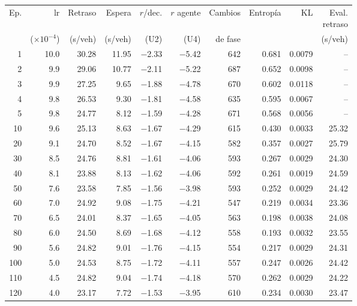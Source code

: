 \begin{table}[H]
\centering
\scriptsize
\setlength{\tabcolsep}{3pt}
\setlength{\tabcolsep}{2pt}
\begin{tabular}{rrrrrrrrrr}
\toprule
Ep. & lr & Retraso & Espera & $r$/dec. & $r$ agente & Cambios & Entropía & KL & \makecell{Eval.\\retraso} \\
 & ($\times 10^{-4}$) & (s/veh) & (s/veh) & (U2) & (U4) & de fase &  &  & (s/veh) \\
\midrule
1 & 10.0 & 30.28 & 11.95 & $-$2.33 & $-$5.42 & 642 & 0.681 & 0.0079 & -- \\
2 & 9.9 & 29.06 & 10.77 & $-$2.11 & $-$5.22 & 687 & 0.652 & 0.0098 & -- \\
3 & 9.9 & 27.25 & 9.65 & $-$1.88 & $-$4.78 & 670 & 0.602 & 0.0118 & -- \\
4 & 9.8 & 26.53 & 9.30 & $-$1.81 & $-$4.58 & 635 & 0.595 & 0.0067 & -- \\
5 & 9.8 & 24.77 & 8.12 & $-$1.59 & $-$4.28 & 671 & 0.568 & 0.0056 & -- \\
10 & 9.6 & 25.13 & 8.63 & $-$1.67 & $-$4.29 & 615 & 0.430 & 0.0033 & 25.32 \\
20 & 9.1 & 24.70 & 8.52 & $-$1.67 & $-$4.15 & 582 & 0.357 & 0.0027 & 25.79 \\
30 & 8.5 & 24.76 & 8.81 & $-$1.61 & $-$4.06 & 593 & 0.267 & 0.0029 & 24.30 \\
40 & 8.1 & 23.88 & 8.13 & $-$1.62 & $-$4.06 & 592 & 0.261 & 0.0019 & 24.59 \\
50 & 7.6 & 23.58 & 7.85 & $-$1.56 & $-$3.98 & 593 & 0.252 & 0.0029 & 24.42 \\
60 & 7.0 & 24.92 & 9.08 & $-$1.75 & $-$4.21 & 547 & 0.219 & 0.0034 & 23.36 \\
70 & 6.5 & 24.01 & 8.37 & $-$1.65 & $-$4.05 & 563 & 0.198 & 0.0038 & 24.08 \\
80 & 6.0 & 24.50 & 8.69 & $-$1.68 & $-$4.12 & 558 & 0.193 & 0.0032 & 23.55 \\
90 & 5.6 & 24.82 & 9.01 & $-$1.76 & $-$4.15 & 554 & 0.217 & 0.0029 & 24.31 \\
100 & 5.0 & 24.53 & 8.75 & $-$1.72 & $-$4.11 & 557 & 0.247 & 0.0026 & 24.42 \\
110 & 4.5 & 24.82 & 9.04 & $-$1.74 & $-$4.18 & 570 & 0.262 & 0.0029 & 24.22 \\
120 & 4.0 & 23.17 & 7.72 & $-$1.53 & $-$3.95 & 610 & 0.234 & 0.0030 & 23.47 \\

\end{tabular}
\end{table}
